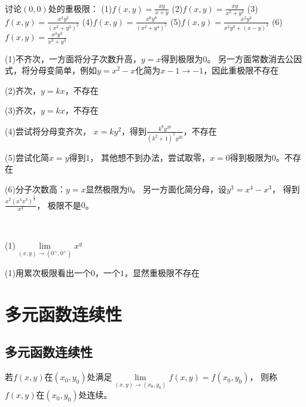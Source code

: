 ~

\begin{exercise}[多元分式]
  讨论$(0,0)$处的重极限：
  (1)$f(x,y) = \frac{xy}{x+y}$
  (2)$f(x,y) = \frac{xy}{x^2 + y^2}$
  (3)$f(x,y) = \frac{x^2y^2}{(x^2 + y^2)^2}$
  (4)$f(x,y) = \frac{x^6y^8}{(x^2 + y^4)^5}$
  (5)$f(x,y) = \frac{x^2y^2}{x^2y^2 + (x-y)^2}$
  (6)$f(x,y) = \frac{x^2y^2}{x^3 + y^3}$
\end{exercise}

\begin{solution}
  (1)不齐次，一方面将分子次数升高，$y = x$得到极限为$0$。
  另一方面常数消去公因式，将分母变简单，例如$y = x^2 - x$化简为$x - 1 \rightarrow -1$，因此重极限不存在

  (2)齐次，$y = kx$，不存在

  (3)齐次，$y = kx$，不存在

  (4)尝试将分母变齐次，
  $x = ky^2$，得到$\frac{k^6y^{20}}{(k^2+1)^5y^{20}}$，不存在

  (5)尝试化简$x = y$得到$1$，
  其他想不到办法，尝试取零，$x = 0$得到极限为$0$。不存在

  (6)分子次数高：$y = x$显然极限为$0$。
  另一方面化简分母，设$y^3 = x^4 - x^3$，
  得到$\frac{x^2(x^4x^3)^{\frac{2}{3}}}{x^4}$，
  极限不是$0$。
\end{solution}

~

\begin{exercise}[指数形式]
  (1)$\lim \limits _{(x,y) \rightarrow (0^+,0^+)}x^y$
\end{exercise}

\begin{solution}
  (1)用累次极限看出一个$0$，一个$1$，显然重极限不存在
\end{solution}

\section{多元函数连续性}

\subsection{多元函数连续性}

\begin{definition}[多元函数连续]
  若$f(x,y)$在$(x_0,y_0)$处满足$\lim \limits _{(x,y) \rightarrow (x_0,y_0)} f(x,y) = f(x_0,y_0)$，
  则称$f(x,y)$在$(x_0,y_0)$处连续。
\end{definition}

